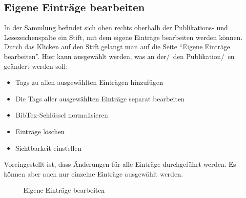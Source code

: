\subsection{Eigene Einträge bearbeiten}
In der Sammlung befindet sich oben rechts oberhalb der Publikations- und Lesezeichenspalte ein Stift, mit dem eigene Einträge bearbeiten werden können. Durch das Klicken auf den Stift gelangt man auf die Seite \enquote{Eigene Einträge bearbeiten}. Hier kann ausgewählt werden, was an der/~den Publikation/~en geändert werden soll:
\begin{itemize}
\item Tags zu allen ausgewählten Einträgen hinzufügen
\item Die Tags aller ausgewählten Einträge separat bearbeiten
\item BibTex-Schlüssel normalisieren
\item Einträge löschen
\item Sichtbarkeit einstellen
\end{itemize}
Voreingestellt ist, dass Änderungen für alle Einträge durchgeführt werden. Es können aber auch nur einzelne Einträge ausgewählt werden.
\begin{figure}[h!]
 \centering
 \caption{Eigene Einträge bearbeiten}
 \label{figure030}
\end{figure}
